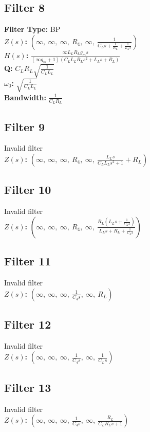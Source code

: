 \documentclass{article}
\begin{document}
\subsection*{Filter 8}
\textbf{Filter Type:} BP \\ 
\textbf{$Z(s)$:} $\left( \infty, \  \infty, \  \infty, \  R_{4}, \  \infty, \  \frac{1}{C_{L} s + \frac{1}{R_{L}} + \frac{1}{L_{L} s}}\right)$ \\ 
\textbf{$H(s)$:} $\frac{\infty L_{L} R_{L} g_{m} s}{\left(\infty g_{m} + 1\right) \left(C_{L} L_{L} R_{L} s^{2} + L_{L} s + R_{L}\right)}$ \\ 
\textbf{Q:} $C_{L} R_{L} \sqrt{\frac{1}{C_{L} L_{L}}}$ \\ 
\textbf{$\omega_0$:} $\sqrt{\frac{1}{C_{L} L_{L}}}$ \\ 
\textbf{Bandwidth:} $\frac{1}{C_{L} R_{L}}$ \\ 
\subsection*{Filter 9}
Invalid filter \\ 
\textbf{$Z(s)$:} $\left( \infty, \  \infty, \  \infty, \  R_{4}, \  \infty, \  \frac{L_{L} s}{C_{L} L_{L} s^{2} + 1} + R_{L}\right)$ \\ 
\subsection*{Filter 10}
Invalid filter \\ 
\textbf{$Z(s)$:} $\left( \infty, \  \infty, \  \infty, \  R_{4}, \  \infty, \  \frac{R_{L} \left(L_{L} s + \frac{1}{C_{L} s}\right)}{L_{L} s + R_{L} + \frac{1}{C_{L} s}}\right)$ \\ 
\subsection*{Filter 11}
Invalid filter \\ 
\textbf{$Z(s)$:} $\left( \infty, \  \infty, \  \infty, \  \frac{1}{C_{4} s}, \  \infty, \  R_{L}\right)$ \\ 
\subsection*{Filter 12}
Invalid filter \\ 
\textbf{$Z(s)$:} $\left( \infty, \  \infty, \  \infty, \  \frac{1}{C_{4} s}, \  \infty, \  \frac{1}{C_{L} s}\right)$ \\ 
\subsection*{Filter 13}
Invalid filter \\ 
\textbf{$Z(s)$:} $\left( \infty, \  \infty, \  \infty, \  \frac{1}{C_{4} s}, \  \infty, \  \frac{R_{L}}{C_{L} R_{L} s + 1}\right)$ \\ 
\end{document}
